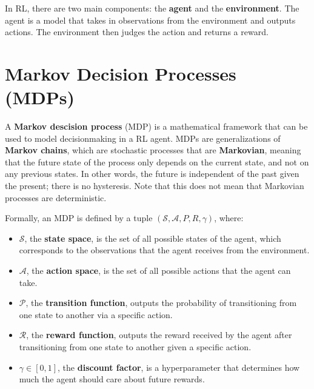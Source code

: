 \documentclass[12pt]{report}
\theoremstyle{definition}
\theoremstyle{remark}
\begin{document}


In RL, there are two main components: the \textbf{agent} and the \textbf{environment}. The agent is a model that takes in observations from the environment and outputs actions.  The environment then judges the action and returns a reward.

\section{Markov Decision Processes (MDPs)}

A \textbf{Markov descision process} (MDP) is a mathematical framework that can be used to model decisionmaking in a RL agent. MDPs are generalizations of \textbf{Markov chains}, which are stochastic processes that are \textbf{Markovian}, meaning that the future state of the process only depends on the current state, and not on any previous states. In other words, the future is independent of the past given the present; there is no hysteresis. Note that this does not mean that Markovian processes are deterministic.

Formally, an MDP is defined by a tuple $(\mathcal{S}, \mathcal{A}, P, R, \gamma)$, where:
\begin{itemize}
    \item $\mathcal{S}$, the \textbf{state space}, is the set of all possible states of the agent, which corresponds to the observations that the agent receives from the environment.
    \item $\mathcal{A}$, the \textbf{action space}, is the set of all possible actions that the agent can take.
    \item $\mathcal{P}$, the \textbf{transition function}, outputs the probability of transitioning from one state to another via a specific action.
    \item $\mathcal{R}$, the \textbf{reward function}, outputs the reward received by the agent after transitioning from one state to another given a specific action.
    \item $\gamma \in [0,1]$, the \textbf{discount factor}, is a hyperparameter that determines how much the agent should care about future rewards.
\end{itemize}
\end{document}
